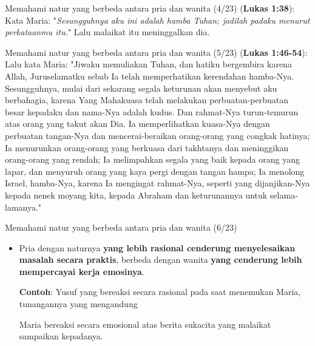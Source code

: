 \documentclass{beamer}
\theoremstyle{mystyle}
\let\emph\relax %
\begin{document}
\begin{frame}{Memahami natur yang berbeda antara pria dan wanita (4/23)}
\emph{Maria} (\textbf{Lukas 1:38}): Kata Maria: "\textit{Sesungguhnya aku ini adalah hamba Tuhan; jadilah padaku menurut perkataanmu itu.}" Lalu malaikat itu meninggalkan dia.
\end{frame}

\begin{frame}{Memahami natur yang berbeda antara pria dan wanita (5/23)}
\emph{Maria} (\textbf{Lukas 1:46-54}): Lalu kata Maria: "Jiwaku memuliakan Tuhan, dan hatiku bergembira karena Allah, Juruselamatku sebab Ia telah memperhatikan kerendahan hamba-Nya. Sesungguhnya, mulai dari sekarang segala keturunan akan menyebut aku berbahagia, karena Yang Mahakuasa telah melakukan perbuatan-perbuatan besar kepadaku dan nama-Nya adalah kudus. Dan rahmat-Nya turun-temurun atas orang yang takut akan Dia. Ia memperlihatkan kuasa-Nya dengan perbuatan tangan-Nya dan mencerai-beraikan orang-orang yang congkak hatinya; Ia menurunkan orang-orang yang berkuasa dari takhtanya dan meninggikan orang-orang yang rendah; Ia melimpahkan segala yang baik kepada orang yang lapar, dan menyuruh orang yang kaya pergi dengan tangan hampa; Ia menolong Israel, hamba-Nya, karena Ia mengingat rahmat-Nya, seperti yang dijanjikan-Nya kepada nenek moyang kita, kepada Abraham dan keturunannya untuk selama-lamanya." 	
\end{frame}

\begin{frame}{Memahami natur yang berbeda antara pria dan wanita (6/23)}
		\begin{itemize}
		\item Pria dengan naturnya \textbf{yang lebih rasional cenderung menyelesaikan masalah secara praktis}, berbeda dengan wanita \textbf{yang cenderung lebih mempercayai kerja emosinya}.
		
		\bigskip
		
		\textbf{Contoh}: Yusuf yang bereaksi secara rasional pada saat menemukan Maria, tunangannya yang mengandung 


		\bigskip
		
		Maria bereaksi secara emosional atas berita sukacita yang malaikat sampaikan kepadanya.		
	\end{itemize}	
\end{frame}
\end{document}
